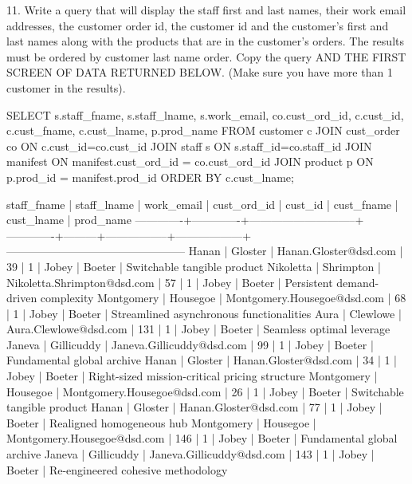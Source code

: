 11. Write a query that will display the staff first and last names, their work email addresses, the customer order id, the customer id and the customer's first and last names along with the products that are in the customer's orders. The results must be ordered by customer last name order. Copy the query AND THE FIRST SCREEN OF DATA RETURNED BELOW. (Make sure you have more than 1 customer in the results).
\begin{sql}
SELECT s.staff_fname, s.staff_lname, s.work_email, co.cust_ord_id, c.cust_id, c.cust_fname, c.cust_lname, p.prod_name FROM customer c
JOIN cust_order co ON c.cust_id=co.cust_id
JOIN staff s ON s.staff_id=co.staff_id
JOIN manifest ON manifest.cust_ord_id = co.cust_ord_id
JOIN product p ON p.prod_id = manifest.prod_id
ORDER BY c.cust_lname;
\end{sql}
\begin{pseudo*}
 staff_fname | staff_lname |         work_email          | cust_ord_id | cust_id |   cust_fname    |    cust_lname    |                   prod_name
-------------+-------------+-----------------------------+-------------+---------+-----------------+------------------+------------------------------------------------
 Hanan       | Gloster     | Hanan.Gloster@dsd.com       |          39 |       1 | Jobey           | Boeter           | Switchable tangible product
 Nikoletta   | Shrimpton   | Nikoletta.Shrimpton@dsd.com |          57 |       1 | Jobey           | Boeter           | Persistent demand-driven complexity
 Montgomery  | Housegoe    | Montgomery.Housegoe@dsd.com |          68 |       1 | Jobey           | Boeter           | Streamlined asynchronous functionalities
 Aura        | Clewlowe    | Aura.Clewlowe@dsd.com       |         131 |       1 | Jobey           | Boeter           | Seamless optimal leverage
 Janeva      | Gillicuddy  | Janeva.Gillicuddy@dsd.com   |          99 |       1 | Jobey           | Boeter           | Fundamental global archive
 Hanan       | Gloster     | Hanan.Gloster@dsd.com       |          34 |       1 | Jobey           | Boeter           | Right-sized mission-critical pricing structure
 Montgomery  | Housegoe    | Montgomery.Housegoe@dsd.com |          26 |       1 | Jobey           | Boeter           | Switchable tangible product
 Hanan       | Gloster     | Hanan.Gloster@dsd.com       |          77 |       1 | Jobey           | Boeter           | Realigned homogeneous hub
 Montgomery  | Housegoe    | Montgomery.Housegoe@dsd.com |         146 |       1 | Jobey           | Boeter           | Fundamental global archive
 Janeva      | Gillicuddy  | Janeva.Gillicuddy@dsd.com   |         143 |       1 | Jobey           | Boeter           | Re-engineered cohesive methodology

\end{pseudo*}
